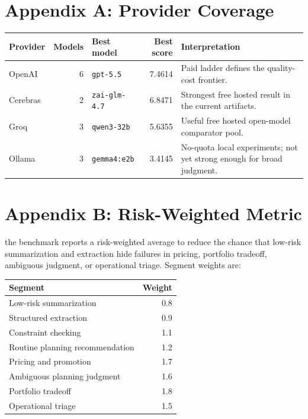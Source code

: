 \documentclass[11pt]{article}
\newcommand{\code}[1]{\texttt{#1}}
\begin{document}
\appendix

\section{Appendix A: Provider Coverage}

\begin{center}
\begin{tabularx}{\textwidth}{l r X r X}
\toprule
Provider & Models & Best model & Best score & Interpretation \\
\midrule
OpenAI & 6 & \code{gpt-5.5} & 7.4614 & Paid ladder defines the quality-cost frontier. \\
Cerebras & 2 & \code{zai-glm-4.7} & 6.8471 & Strongest free hosted result in the current artifacts. \\
Groq & 3 & \code{qwen3-32b} & 5.6355 & Useful free hosted open-model comparator pool. \\
Ollama & 3 & \code{gemma4:e2b} & 3.4145 & No-quota local experiments; not yet strong enough for broad judgment. \\
\bottomrule
\end{tabularx}
\end{center}

\section{Appendix B: Risk-Weighted Metric}

the benchmark reports a risk-weighted average to reduce the chance that low-risk summarization and extraction hide failures in pricing, portfolio tradeoff, ambiguous judgment, or operational triage. Segment weights are:

\begin{center}
\begin{tabular}{lr}
\toprule
Segment & Weight \\
\midrule
Low-risk summarization & 0.8 \\
Structured extraction & 0.9 \\
Constraint checking & 1.1 \\
Routine planning recommendation & 1.2 \\
Pricing and promotion & 1.7 \\
Ambiguous planning judgment & 1.6 \\
Portfolio tradeoff & 1.8 \\
Operational triage & 1.5 \\
\bottomrule
\end{tabular}
\end{center}
\end{document}

